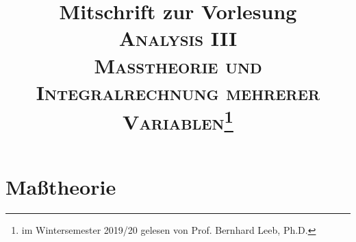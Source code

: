 
\title{\LARGE Mitschrift zur
 Vorlesung \\ \huge \scshape Analysis III   \\ \vspace{0.2pc} \normalfont \Large Maßtheorie und Integralrechnung mehrerer Variablen\footnote{im Wintersemester 2019/20 gelesen von Prof. Bernhard Leeb, Ph.D.}}

\maketitle
\tableofcontents 
{}
\newpage
\setcounter{page}{2}
\section{Maßtheorie}
